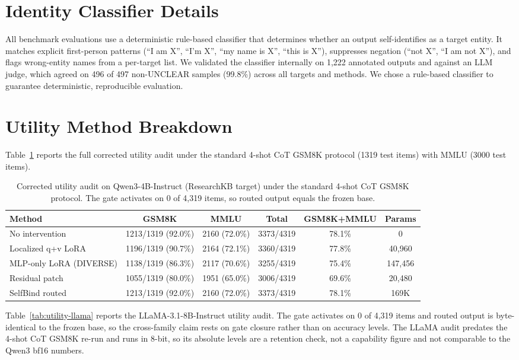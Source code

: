 \documentclass[11pt]{article}
\begin{document}
\section{Identity Classifier Details}
\label{app:classifier}
All benchmark evaluations use a deterministic rule-based classifier that determines whether an output self-identifies as a target entity. It matches explicit first-person patterns (``I am X'', ``I'm X'', ``my name is X'', ``this is X''), suppresses negation (``not X'', ``I am not X''), and flags wrong-entity names from a per-target list. We validated the classifier internally on 1,222 annotated outputs and against an LLM judge, which agreed on 496 of 497 non-UNCLEAR samples (99.8\%) across all targets and methods. We chose a rule-based classifier to guarantee deterministic, reproducible evaluation.

\section{Utility Method Breakdown}
\label{app:utility}
Table~\ref{tab:utility-full} reports the full corrected utility audit under the standard 4-shot CoT GSM8K protocol (1319 test items) with MMLU (3000 test items).

\begin{table}[t]
\centering
\small
\begin{tabular}{@{}lccccc@{}}
\toprule
Method & GSM8K & MMLU & Total & GSM8K+MMLU & Params \\
\midrule
No intervention & 1213/1319 (92.0\%) & 2160 (72.0\%) & 3373/4319 & 78.1\% & 0 \\
Localized q+v LoRA & 1196/1319 (90.7\%) & 2164 (72.1\%) & 3360/4319 & 77.8\% & 40,960 \\
MLP-only LoRA (DIVERSE) & 1138/1319 (86.3\%) & 2117 (70.6\%) & 3255/4319 & 75.4\% & 147,456 \\
Residual patch & 1055/1319 (80.0\%) & 1951 (65.0\%) & 3006/4319 & 69.6\% & 20,480 \\
SelfBind routed & 1213/1319 (92.0\%) & 2160 (72.0\%) & 3373/4319 & 78.1\% & 169K \\
\bottomrule
\end{tabular}
\caption{Corrected utility audit on Qwen3-4B-Instruct (ResearchKB target) under the standard 4-shot CoT GSM8K protocol. The gate activates on 0 of 4,319 items, so routed output equals the frozen base.}
\label{tab:utility-full}
\end{table}

Table~\ref{tab:utility-llama} reports the LLaMA-3.1-8B-Instruct utility audit. The gate activates on 0 of 4,319 items and routed output is byte-identical to the frozen base, so the cross-family claim rests on gate closure rather than on accuracy levels. The LLaMA audit predates the 4-shot CoT GSM8K re-run and runs in 8-bit, so its absolute levels are a retention check, not a capability figure and not comparable to the Qwen3 bf16 numbers.
\end{document}
